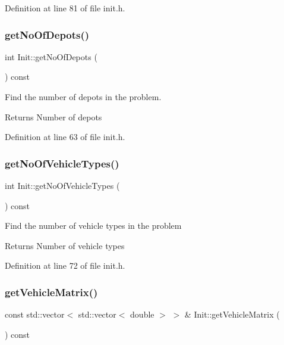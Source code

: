 Definition at line 81 of file init.\+h.

\mbox{\label{class_init_ad6dd362eb2f7b5ac46af9666b7d920da}} 
\subsubsection{\texorpdfstring{get\+No\+Of\+Depots()}{getNoOfDepots()}}
{\footnotesize\ttfamily int Init\+::get\+No\+Of\+Depots (\begin{DoxyParamCaption}{ }\end{DoxyParamCaption}) const\hspace{0.3cm}{\ttfamily [inline]}}

Find the number of depots in the problem. \begin{DoxyReturn}{Returns}
Number of depots 
\end{DoxyReturn}


Definition at line 63 of file init.\+h.

\mbox{\label{class_init_a3589c9bb9d90429ca08c476163aa1b28}} 
\subsubsection{\texorpdfstring{get\+No\+Of\+Vehicle\+Types()}{getNoOfVehicleTypes()}}
{\footnotesize\ttfamily int Init\+::get\+No\+Of\+Vehicle\+Types (\begin{DoxyParamCaption}{ }\end{DoxyParamCaption}) const\hspace{0.3cm}{\ttfamily [inline]}}

Find the number of vehicle types in the problem \begin{DoxyReturn}{Returns}
Number of vehicle types 
\end{DoxyReturn}


Definition at line 72 of file init.\+h.

\mbox{\label{class_init_a50e5ae9da26f66e57b81e1cfda053dcb}} 
\subsubsection{\texorpdfstring{get\+Vehicle\+Matrix()}{getVehicleMatrix()}}
{\footnotesize\ttfamily const std\+::vector$<$ std\+::vector$<$ double $>$ $>$ \& Init\+::get\+Vehicle\+Matrix (\begin{DoxyParamCaption}{ }\end{DoxyParamCaption}) const\hspace{0.3cm}{\ttfamily [inline]}}

